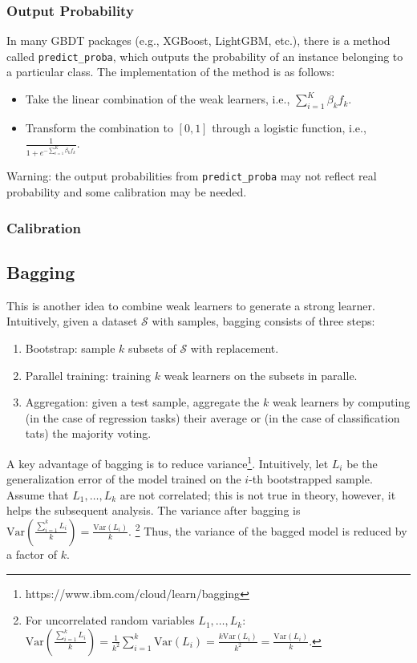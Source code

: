     \subsubsection{Output Probability}
        In many GBDT packages (e.g., XGBoost, LightGBM, etc.), there is a method called \texttt{predict\_proba}, which outputs the probability of an instance belonging to a particular class.
        The implementation of the method is as follows:
        \begin{itemize}
            \item Take the linear combination of the weak learners, i.e., $\sum_{i=1}^{K}{\beta_k f_k}$.
            \item Transform the combination to $[0, 1]$ through a logistic function, i.e., $\frac{1}{1 + e^{-\sum_{i=1}^{K}{\beta_k f_k}}}$.
        \end{itemize}
    Warning: the output probabilities from \texttt{predict\_proba} may not reflect real probability and some calibration may be needed.

    \subsubsection{Calibration}
        
        
    
    
    
\subsection{Bagging}

This is another idea to combine weak learners to generate a strong learner. 
Intuitively, given a dataset $\mathcal{S}$ with \ndata samples, bagging consists of three steps:
    \begin{enumerate}
        \item Bootstrap: sample $k$ subsets of $\mathcal{S}$ with replacement. 
        \item Parallel training: training $k$ weak learners on the subsets in paralle. 
        \item Aggregation: given a test sample, aggregate the $k$ weak learners by computing (in the case of regression tasks) their average or (in the case of classification tats) the majority voting.
    \end{enumerate}
A key advantage of bagging is to reduce variance\footnote{https://www.ibm.com/cloud/learn/bagging}.
Intuitively, let $L_i$ be the generalization error of the model trained on the $i$-th bootstrapped sample.
Assume that $L_1, \ldots, L_k$ are not correlated; this is not true in theory, however, it helps the subsequent analysis.
The variance after bagging is $\text{Var}\left(\frac{\sum_{i=1}^{k}{L_i}}{k}\right) = \frac{\text{Var}(L_i)}{k}$.
\footnote{For uncorrelated random variables $L_1, \ldots, L_k$: $\text{Var}\left(\frac{\sum_{i=1}^{k}{L_i}}{k}\right) = \frac{1}{k^2} \sum_{i=1}^{k}{\text{Var}(L_i)} = \frac{k \text{Var}(L_i)}{k^2} =  \frac{ \text{Var}(L_i)}{k}$.}
Thus, the variance of the bagged model is reduced by a factor of $k$.



